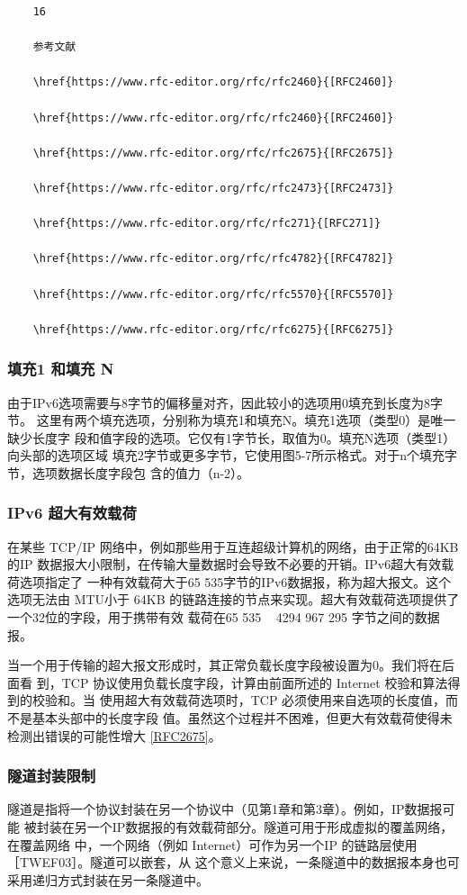\begin{verbatim}
    16

    参考文献

    \href{https://www.rfc-editor.org/rfc/rfc2460}{[RFC2460]}

    \href{https://www.rfc-editor.org/rfc/rfc2460}{[RFC2460]}

    \href{https://www.rfc-editor.org/rfc/rfc2675}{[RFC2675]}

    \href{https://www.rfc-editor.org/rfc/rfc2473}{[RFC2473]}

    \href{https://www.rfc-editor.org/rfc/rfc271}{[RFC271]}

    \href{https://www.rfc-editor.org/rfc/rfc4782}{[RFC4782]}

    \href{https://www.rfc-editor.org/rfc/rfc5570}{[RFC5570]}

    \href{https://www.rfc-editor.org/rfc/rfc6275}{[RFC6275]}
\end{verbatim}

\subsubsection{填充1 和填充 N}
由于IPv6选项需要与8字节的偏移量对齐，因此较小的选项用0填充到长度为8字节。
这里有两个填充选项，分别称为填充1和填充N。填充1选项（类型0）是唯一缺少长度字
段和值字段的选项。它仅有1字节长，取值为0。填充N选项（类型1）向头部的选项区域
填充2字节或更多字节，它使用图5-7所示格式。对于n个填充字节，选项数据长度字段包
含的值力（n-2）。

\subsubsection{IPv6 超大有效载荷}

在某些 TCP/IP 网络中，例如那些用于互连超级计算机的网络，由于正常的64KB 的IP
数据报大小限制，在传输大量数据时会导致不必要的开销。IPv6超大有效载荷选项指定了
一种有效载荷大于65 535字节的IPv6数据报，称为超大报文。这个选项无法由 MTU小于
64KB 的链路连接的节点来实现。超大有效载荷选项提供了一个32位的字段，用于携带有效
载荷在65 535 ~ 4294 967 295 字节之间的数据报。

当一个用于传输的超大报文形成时，其正常负载长度字段被设置为0。我们将在后面看
到，TCP 协议使用负载长度字段，计算由前面所述的 Internet 校验和算法得到的校验和。当
使用超大有效载荷选项时，TCP 必须使用来自选项的长度值，而不是基本头部中的长度字段
值。虽然这个过程并不困难，但更大有效载荷使得未检测出错误的可能性增大
\href{https://www.rfc-editor.org/rfc/rfc2675}{[RFC2675]}。

\subsubsection{隧道封装限制}
隧道是指将一个协议封装在另一个协议中（见第1章和第3章）。例如，IP数据报可能
被封装在另一个IP数据报的有效载荷部分。隧道可用于形成虚拟的覆盖网络，在覆盖网络
中，一个网络（例如 Internet）可作为另一个IP 的链路层使用［TWEF03］。隧道可以嵌套，从
这个意义上来说，一条隧道中的数据报本身也可采用递归方式封装在另一条隧道中。

